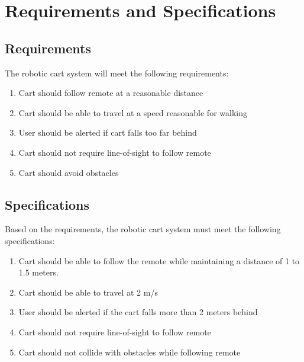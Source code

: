 \documentclass[12pt]{article} %
\begin{document}
\section{Requirements and Specifications}
\subsection{Requirements}
The robotic cart system will meet the following requirements:
\begin{enumerate}
    \item Cart should follow remote at a reasonable distance
    \item Cart should be able to travel at a speed reasonable for walking
    \item User should be alerted if cart falls too far behind
    \item Cart should not require line-of-sight to follow remote
    \item Cart should avoid obstacles
\end{enumerate}

\subsection{Specifications}
Based on the requirements, the robotic cart system must meet the following specifications:
\begin{enumerate}
    \item Cart should be able to follow the remote while maintaining a distance of 1 to 1.5 meters.
    \item Cart should be able to travel at 2 m/s
    \item User should be alerted if the cart falls more than 2 meters behind
    \item Cart should not require line-of-sight to follow remote
    \item Cart should not collide with obstacles while following remote
\end{enumerate}
\end{document}
